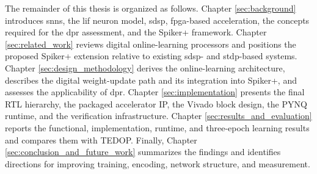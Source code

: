 The remainder of this thesis is organized as follows. Chapter \ref{sec:background} introduces \glspl{snn}, the \gls{lif} neuron model, \gls{sdsp}, \gls{fpga}-based acceleration, the concepts required for the \gls{dpr} assessment, and the Spiker+ framework. Chapter \ref{sec:related_work} reviews digital online-learning processors and positions the proposed Spiker+ extension relative to existing \gls{sdsp}- and \gls{stdp}-based systems. Chapter \ref{sec:design_methodology} derives the online-learning architecture, describes the digital weight-update path and its integration into Spiker+, and assesses the applicability of \gls{dpr}. Chapter \ref{sec:implementation} presents the final RTL hierarchy, the packaged accelerator IP, the Vivado block design, the PYNQ runtime, and the verification infrastructure. Chapter \ref{sec:results_and_evaluation} reports the functional, implementation, runtime, and three-epoch learning results and compares them with TEDOP. Finally, Chapter \ref{sec:conclusion_and_future_work} summarizes the findings and identifies directions for improving training, encoding, network structure, and measurement.
